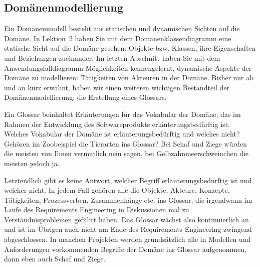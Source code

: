 \subsection{Domänenmodellierung}
\label{sec:Kap-6.3.2}

Ein Domänenmodell besteht aus statischen und dynamischen Sichten auf die Domäne. In Lektion~2 %
haben Sie mit dem Domänenklassendiagramm eine statische Sicht auf die Domäne gesehen: Objekte bzw. Klassen, ihre Eigenschaften und Beziehungen zueinander. Im letzten Abschnitt haben Sie mit dem Anwendungsfalldiagramm Möglichkeiten kennengelernt, dynamische Aspekte der Domäne zu modellieren: Tätig\-keiten von Akteuren in der Domäne. Bisher nur ab und an kurz erwähnt, haben wir einen weiteren wichtigen Bestandteil der Domänenmodellierung, die Erstellung eines Glossars.

\vspace{2mm} %


Ein Glossar beinhaltet Erläuterungen für das Vokabular der Domäne, das im Rahmen der Entwicklung des Softwareprodukts erläuterungsbedürftig ist. Welches 
\linebreak %
Vokabular der Domäne ist erläuterungsbedürftig und welches nicht? Gehören im Zoobeispiel die Tierarten ins Glossar? Bei Schaf und Ziege würden die meisten von Ihnen vermutlich nein sagen, bei Gelbzahnmeerschweinchen die meisten jedoch ja. 

\vspace{2mm} %

Letztendlich gibt es keine Antwort, welcher Begriff erläuterungsbedürftig ist und welcher nicht. In jedem Fall gehören alle die Objekte, Akteure, Konzepte, Tätigkeiten, Prozessverben, Zusammenhänge etc. ins Glossar, die irgendwann im Laufe des Requirements Engineering in Diskussionen mal zu Verständnisproblemen geführt haben. Das Glossar wächst also kontinuierlich an und ist im Übrigen auch nicht am Ende des Requirements Engineering zwingend abgeschlossen. In manchen Projekten werden grundsätzlich alle in Modellen und Anforderungen vorkommenden Begriffe der Domäne ins Glossar aufgenommen, dann eben auch Schaf und Ziege.

\vspace{2mm} %


